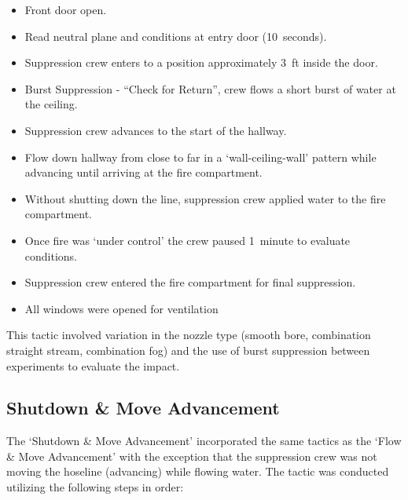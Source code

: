 \documentclass[12pt,oneside]{book}
\begin{document}
\begin{itemize}
	\item{Front door open.}
	\item{Read neutral plane and conditions at entry door (10~seconds).}
	\item{Suppression crew enters to a position approximately 3~ft inside the door.}
	\item{Burst Suppression - ``Check for Return'', crew flows a short burst of water at the ceiling.}
	\item{Suppression crew advances to the start of the hallway.}
	\item{Flow down hallway from close to far in a `wall-ceiling-wall' pattern while advancing until arriving at the fire compartment.}
	\item{Without shutting down the line, suppression crew applied water to the fire compartment.}
	\item{Once fire was `under control' the crew paused 1~minute to evaluate conditions.}
	\item{Suppression crew entered the fire compartment for final suppression.}
	\item{All windows were opened for ventilation}
\end{itemize}

This tactic involved variation in the nozzle type (smooth bore, combination straight stream, combination fog) and the use of burst suppression between experiments to evaluate the impact.

\clearpage

\subsection{Shutdown \& Move Advancement}
The `Shutdown \& Move Advancement' incorporated the same tactics as the `Flow \& Move Advancement' with the exception that the suppression crew was not moving the hoseline (advancing) while flowing water. The tactic was conducted utilizing the following steps in order:
\end{document}
